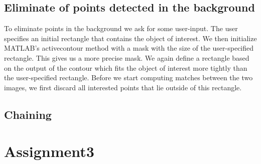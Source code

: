 \documentclass[12pt]{amsart}
\begin{document}
\subsection{Eliminate of points detected in the background}
\label{background}
To eliminate points in the background we ask for some user-input. The user specifies an initial rectangle that contains the object of interest. We then initialize MATLAB's activecontour method with a mask with the size of the user-specified rectangle. This gives us a more precise mask. We again define a rectangle based on the output of the contour which fits the object of interest more tightly than the user-specified rectangle. Before we start computing matches between the two images, we first discard all interested points that lie outside of this rectangle. 

\subsection{Chaining}

\section{Assignment3}
\end{document}
